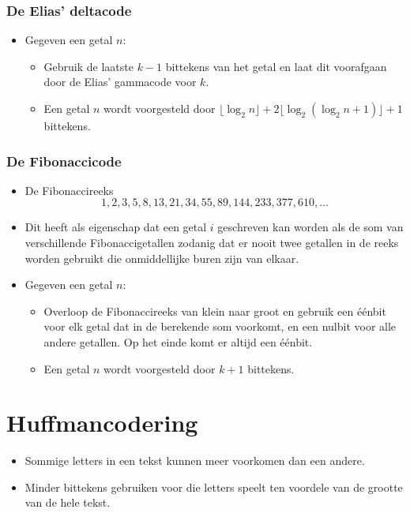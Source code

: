 \subsubsection{De Elias' deltacode}
\begin{itemize}
    \item Gegeven een getal $n$:
    \begin{itemize}
        \item Gebruik de laatste $k-1$ bittekens van het getal en laat dit voorafgaan door de Elias' gammacode voor $k$.
        \item Een getal $n$ wordt voorgesteld door $\lfloor \log_2 n\rfloor  + 2\lfloor \log_2(\log_2 n + 1)\rfloor + 1$ bittekens.
    \end{itemize}
\end{itemize}

\subsubsection{De Fibonaccicode}
\begin{itemize}
    \item De Fibonaccireeks
    $$1, 2, 3, 5, 8, 13, 21, 34, 55, 89, 144, 233, 377, 610, ...$$
    \item Dit heeft als eigenschap dat een getal $i$ geschreven kan worden als de som van verschillende Fibonaccigetallen zodanig dat er nooit twee getallen in de reeks worden gebruikt die onmiddellijke buren zijn van elkaar.
    \item Gegeven een getal $n$:
    \begin{itemize}
        \item Overloop de Fibonaccireeks van klein naar groot en gebruik een éénbit voor elk getal dat in de berekende som voorkomt, en een nulbit voor alle andere getallen. Op het einde komt er altijd een éénbit. 
        \item Een getal $n$ wordt voorgesteld door $k + 1$ bittekens.
    \end{itemize}
\end{itemize}

\section{Huffmancodering}
\begin{itemize}
    \item Sommige letters in een tekst kunnen meer voorkomen dan een andere.
    \item Minder bittekens gebruiken voor die letters speelt ten voordele van de grootte van de hele tekst.
\end{itemize}

